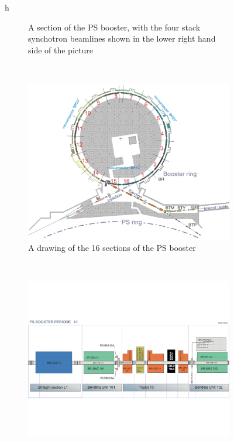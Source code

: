\begin{figure}{h}
\begin{subfigure}[h]{0.4\textwidth}
        \caption{A section of the PS booster, with the four stack
          synchotron beamlines shown in the lower right hand side of the picture}\label{fig:psbooster_4stacks}
      \end{subfigure}
       ~ %
      \begin{subfigure}[h]{0.4\textwidth}
        \includegraphics[width=\textwidth]{Figures/LHC_Diagrams/LHC__PSbooster__Layout.pdf}
        \caption{A drawing of the 16 sections of the PS booster}\label{fig:psbooster_16sections}
      \end{subfigure}
       ~ %
      \begin{subfigure}[h]{0.4\textwidth}
        \includegraphics[width=\textwidth]{Figures/LHC_Diagrams/LHC__PSbooster__sect10.pdf}

\end{subfigure}
\end{figure}
